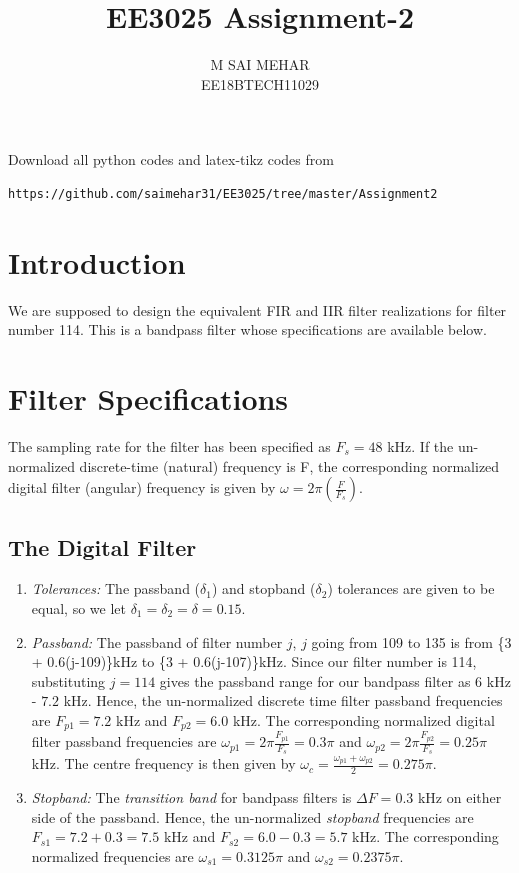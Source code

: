 \documentclass{article}
\begin{document}
\title{EE3025 Assignment-2}

\author{M SAI MEHAR\\ EE18BTECH11029}

\maketitle
Download all python codes and latex-tikz codes from 
\begin{verbatim}
https://github.com/saimehar31/EE3025/tree/master/Assignment2
\end{verbatim}
%
\section{Introduction}
We are supposed to design the equivalent FIR and IIR filter realizations for filter number 114.  
This is a bandpass filter whose specifications are available below.

\section{Filter Specifications}
The sampling rate for the filter has been specified as $F_s =  48$ kHz.	If the un-normalized  discrete-time (natural) frequency is F, the corresponding normalized digital filter (angular) frequency is given by $\omega = 2\pi
\left(\frac{F}{F_s}\right)$.

\subsection{The Digital Filter}

\begin{enumerate}
\item {\em Tolerances:}  The passband ($\delta_1$) and stopband ($\delta_2$) tolerances are given to
be equal, so we let $\delta_1 = \delta_2 = \delta = 0.15$.

\item {\em Passband:}  The passband of filter number $j$, $j$ going from 109 to 135 is from \{3 + 0.6(j-109)\}kHz
to \{3 + 0.6(j-107)\}kHz.  Since our filter number is 114, substituting $j = 114$ gives the passband
range for our bandpass filter as $6$ kHz - $7.2$ kHz.  Hence, the un-normalized discrete time filter
passband frequencies are $F_{p1} = 7.2$ kHz
and $F_{p2} = 6.0$ kHz.  The corresponding normalized digital filter passband frequencies are
$\omega_{p1} = 2\pi\frac{F_{p1}}{F_s}  = 0.3\pi$  and $\omega_{p2} = 2\pi\frac{F_{p2}}{F_s}  = 0.25 \pi$ kHz.  The centre frequency is then given by  $\omega_c = \frac{\omega_{p1} + \omega_{p2}}{2} = 0.275\pi$.  

\item {\em Stopband:}  The {\em transition band} for bandpass filters is $\Delta F = 0.3$ kHz on either side of the passband.
Hence, the un-normalized {\em stopband} frequencies are $F_{s1} = 7.2 + 0.3 = 7.5$ kHz and $F	_{s2} = 6.0 - 0.3 = 5.7$ kHz.  The corresponding normalized frequencies are $\omega_{s1} = 0.3125 \pi$  and $\omega_{s2} =  0.2375 \pi$.
\end{enumerate}
\end{document}

